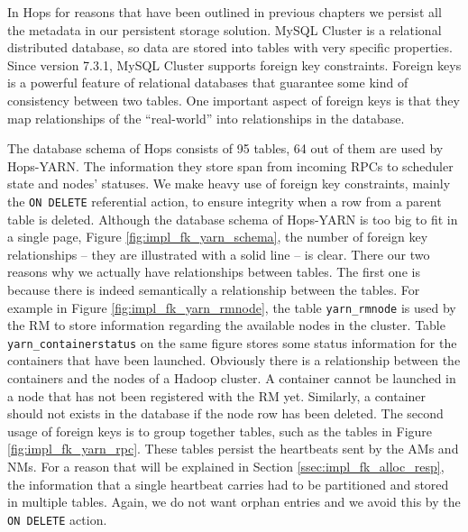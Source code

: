 In Hops for reasons that have been outlined in previous chapters we
persist all the metadata in our persistent storage solution. MySQL
Cluster is a relational distributed database, so data are stored into
tables with very specific properties. Since version 7.3.1, MySQL
Cluster supports foreign key constraints. Foreign keys is a powerful
feature of relational databases that guarantee some kind of
consistency between two tables. One important aspect of foreign keys
is that they map relationships of the ``real-world'' into
relationships in the database.

The database schema of Hops consists of 95 tables, 64 out of them are
used by Hops-YARN. The information they store span from incoming RPCs
to scheduler state and nodes' statuses. We make heavy use of foreign
key constraints, mainly the \texttt{ON DELETE} referential action, to
ensure integrity when a row from a parent table is deleted. Although
the database schema of Hops-YARN is too big to fit in
a single page, Figure \ref{fig:impl_fk_yarn_schema}, the number of
foreign key relationships -- they are illustrated with a solid line --
is clear. There our two reasons why we actually have relationships
between tables. The first one is because there is indeed semantically a
relationship between the tables. For example in Figure
\ref{fig:impl_fk_yarn_rmnode}, the table \texttt{yarn\_rmnode} is used by
the RM to store information regarding the available nodes in
the cluster. Table \texttt{yarn\_containerstatus} on the same figure
stores some status information for the containers that have been
launched. Obviously there is a relationship between the containers and
the nodes of a Hadoop cluster. A container cannot be launched in a
node that has not been registered with the RM yet. Similarly,
a container should not exists in the database if the node row has been
deleted. The second usage of foreign keys is to group together tables,
such as the tables in Figure \ref{fig:impl_fk_yarn_rpc}. These tables
persist the heartbeats sent by the AMs and NMs. For a reason that will
be explained in Section \ref{ssec:impl_fk_alloc_resp}, the information that a
single heartbeat carries had to be partitioned and stored in multiple
tables. Again, we do not want orphan entries and we avoid this by the
\texttt{ON DELETE} action.

